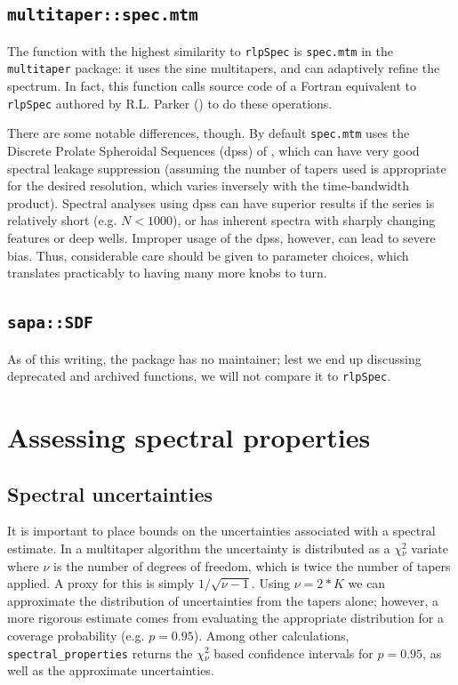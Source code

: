 \documentclass{article}\usepackage{graphicx, color}
\newcommand{\Rcmd}[1]{\texttt{#1}}
\newcommand{\rlp}[0]{\Rcmd{rlpSpec}}
\begin{document}
\subsection{\Rcmd{multitaper::spec.mtm}}
The function with the highest similarity to \rlp{} is
\Rcmd{spec.mtm} in the \Rcmd{multitaper} package: it uses
the sine multitapers, and can adaptively refine the spectrum.
In fact, this function
calls source code of a Fortran equivalent to \rlp{}
authored by R.L. Parker (\citeyear{parkerweb}) to do these operations.

There are some notable differences, though.  
By default \Rcmd{spec.mtm}
 uses the Discrete Prolate Spheroidal Sequences (dpss) 
of \citet{thomson1982},
which can have very good spectral leakage suppression (assuming
the number of tapers used is appropriate for the 
desired resolution, which varies inversely with the time-bandwidth product).
Spectral analyses using dpss can have superior results if the series is
relatively short (e.g. $N < 1000$), or has inherent spectra
with sharply changing features or
deep wells.
Improper usage of the dpss, however, can lead to severe bias.
Thus, considerable care should be given to parameter choices, 
which translates practicably
to having many more knobs to turn.

\subsection{\Rcmd{sapa::SDF}}
As of this writing, the package has no maintainer; 
lest we end up discussing deprecated and archived functions,
we will not compare it to \rlp{}.

\section{Assessing spectral properties}
\subsection{Spectral uncertainties}
It is important to place bounds on the uncertainties associated
with a spectral estimate.
In a multitaper algorithm the uncertainty is distributed as
a $\chi{}_{\nu}^2$ variate where $\nu$ is
the number of degrees of freedom, which is twice the
number of tapers applied.
A proxy for this is simply $1/\sqrt{\nu - 1}$.
Using $\nu = 2*K$ we can approximate the distribution
of uncertainties from the tapers alone; however, a more
rigorous estimate comes from evaluating the appropriate 
distribution  for a coverage probability (e.g. $p=0.95$).
Among other calculations, \Rcmd{spectral\_properties} returns the 
$\chi{}_{\nu}^2$ based confidence intervals for $p=0.95$, as well as the
approximate uncertainties.  
\end{document}
